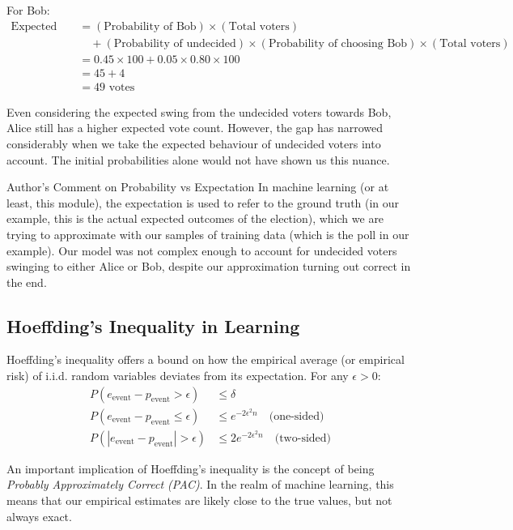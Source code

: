 For Bob:
\begin{align*}
    \text{Expected votes} &= (\text{Probability of Bob}) \times (\text{Total voters}) \\
    &\quad + (\text{Probability of undecided}) \times (\text{Probability of choosing Bob}) \times (\text{Total voters}) \\
    &= 0.45 \times 100 + 0.05 \times 0.80 \times 100 \\
    &= 45 + 4 \\
    &= 49 \text{ votes}
\end{align*}

Even considering the expected swing from the undecided voters towards Bob, Alice still has a higher expected vote count. However, the gap has narrowed considerably when we take the expected behaviour of undecided voters into account. The initial probabilities alone would not have shown us this nuance.

\begin{commentbox}{Author's Comment on Probability vs Expectation}
In machine learning (or at least, this module), the expectation is used to refer to the ground truth (in our example, this is the actual expected outcomes of the election), which we are trying to approximate with our samples of training data (which is the poll in our example). Our model was not complex enough to account for undecided voters swinging to either Alice or Bob, despite our approximation turning out correct in the end.
\end{commentbox}

\subsection{Hoeffding's Inequality in Learning}
Hoeffding's inequality offers a bound on how the empirical average (or empirical risk) of i.i.d. random variables deviates from its expectation. For any \( \epsilon > 0 \):
\begin{align*}
P(e_{\text{event}} - p_{\text{event}} > \epsilon) & \leq \delta \\
P(e_{\text{event}} - p_{\text{event}} \leq \epsilon) & \leq e^{-2\epsilon^2n} \quad \text{(one-sided)} \\
P(|e_{\text{event}} - p_{\text{event}}| > \epsilon) & \leq 2e^{-2\epsilon^2n} \quad \text{(two-sided)}
\end{align*}

An important implication of Hoeffding's inequality is the concept of being \textit{Probably Approximately Correct (PAC)}. In the realm of machine learning, this means that our empirical estimates are likely close to the true values, but not always exact.\\

